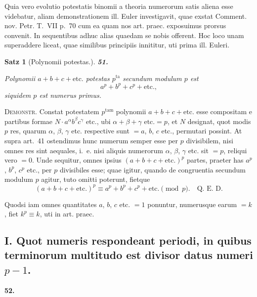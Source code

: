 \documentclass[12pt,a4paper]{article}
\theoremstyle{plain}
\newtheorem{satz}{Satz}[section]
\theoremstyle{definition}
\theoremstyle{remark}
\begin{document}
Quia vero evolutio potestatis binomii a theoria numerorum satis aliena esse videbatur, aliam demonstrationem ill. Euler investigavit, quae exstat Comment. nov. Petr. T.~VII p.~70 cum ea quam nos art. praec. exposuimus prorsus convenit. In sequentibus adhuc alias quaedam se nobis offerent. Hoc loco unam superaddere liceat, quae similibus principiis innititur, uti prima ill. Euleri.

\begin{satz}[Polynomii potestas.]
\setcounter{satz}{51}
\addtocounter{satz}{-1}
\textbf{51.}

Polynomii $a+b+c+\text{etc.}$ potestas $p^\text{ta}$ secundum modulum $p$ est 
\[a^p + b^p + c^p + \text{etc.},\]
siquidem $p$ est numerus primus.
\end{satz}

\textsc{Demonstr.} Constat potestatem $p^\text{tam}$ polynomii $a+b+c+\text{etc.}$ esse compositam e partibus formae $N \cdot a^\alpha b^\beta c^\gamma \text{ etc.}$, ubi $\alpha+\beta+\gamma \text{ etc.} = p$, et $N$ designat, quot modis $p$ res, quarum $\alpha$, $\beta$, $\gamma$ etc. respective sunt $= a$, $b$, $c$ etc., permutari possint. At supra art.~41 ostendimus hunc numerum semper esse per $p$ divisibilem, nisi omnes res sint aequales, i.~e. nisi aliquis numerorum $\alpha$, $\beta$, $\gamma$ etc. sit $=p$, reliqui vero $=0$. Unde sequitur, omnes ipsius $(a+b+c+\text{etc.})^p$ partes, praeter has $a^p$, $b^p$, $c^p$ etc., per $p$ divisibiles esse; quae igitur, quando de congruentia secundum modulum $p$ agitur, tuto omitti poterunt, fietque
\[(a+b+c+\text{etc.})^p \equiv a^p + b^p + c^p + \text{etc.} \pmod{p}. \quad \text{Q.~E.~D.}\]

Quodsi iam omnes quantitates $a$, $b$, $c$ etc. $=1$ ponuntur, numerusque earum $=k$, fiet $k^p \equiv k$, uti in art. praec.

\subsection*{I. Quot numeris respondeant periodi, in quibus terminorum multitudo est divisor datus numeri $p-1$.}

\setcounter{satz}{52}
\addtocounter{satz}{-1}
\textbf{52.}
\end{document}
